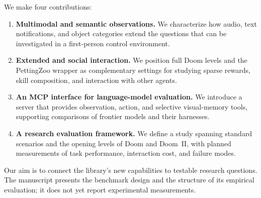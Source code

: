 We make four contributions:
\begin{enumerate}[itemsep=3pt]
\item \textbf{Multimodal and semantic observations.} We characterize how audio, text notifications, and object categories extend the questions that can be investigated in a first-person control environment.
\item \textbf{Extended and social interaction.} We position full Doom levels and the PettingZoo wrapper as complementary settings for studying sparse rewards, skill composition, and interaction with other agents.
\item \textbf{An MCP interface for language-model evaluation.} We introduce a server that provides observation, action, and selective visual-memory tools, supporting comparisons of frontier models and their harnesses.
\item \textbf{A research evaluation framework.} We define a study spanning standard \vzd{} scenarios and the opening levels of Doom and Doom~II, with planned measurements of task performance, interaction cost, and failure modes.
\end{enumerate}

Our aim is to connect the library's new capabilities to testable research questions. The manuscript presents the benchmark design and the structure of its empirical evaluation; it does not yet report experimental measurements.
